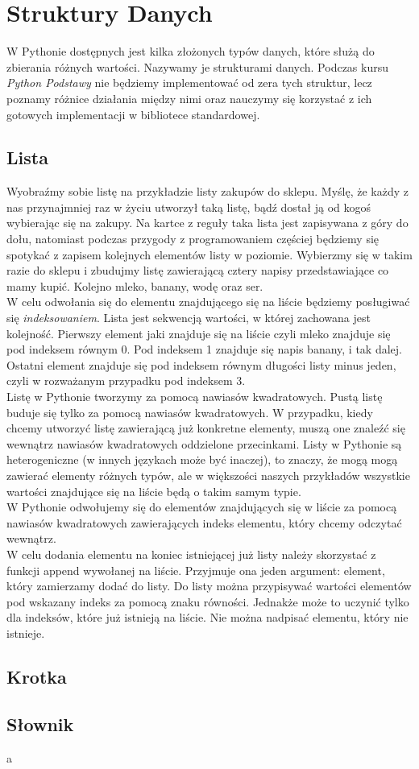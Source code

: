 \documentclass[knowledge.tex]{subfiles}
\begin{document}
    \chapter{Struktury Danych}
    W Pythonie dostępnych jest kilka złożonych typów danych, które służą do zbierania różnych wartości. Nazywamy je strukturami danych. Podczas kursu \textit{Python Podstawy} nie będziemy implementować od zera tych struktur, lecz poznamy różnice działania między nimi oraz nauczymy się korzystać z ich gotowych implementacji w bibliotece standardowej. 
    \section{Lista}
    Wyobraźmy sobie listę na przykładzie listy zakupów do sklepu. Myślę, że każdy z nas przynajmniej raz w życiu utworzył taką listę, bądź dostał ją od kogoś wybierając się na zakupy. Na kartce z reguły taka lista jest zapisywana z góry do dołu, natomiast podczas przygody z programowaniem częściej będziemy się spotykać z zapisem kolejnych elementów listy w poziomie. Wybierzmy się w takim razie do sklepu i zbudujmy listę zawierającą cztery napisy przedstawiające co mamy kupić. Kolejno mleko, banany, wodę oraz ser.\\[0.3cm]
    W celu odwołania się do elementu znajdującego się na liście będziemy posługiwać się \textit{indeksowaniem}. Lista jest sekwencją wartości, w której zachowana jest kolejność. Pierwszy element jaki znajduje się na liście czyli mleko znajduje się pod indeksem równym 0. Pod indeksem 1 znajduje się napis banany, i tak dalej. Ostatni element znajduje się pod indeksem równym długości listy minus jeden, czyli w rozważanym przypadku pod indeksem 3.\\[0.3cm]
    Listę w Pythonie tworzymy za pomocą nawiasów kwadratowych. Pustą listę buduje się tylko za pomocą nawiasów kwadratowych. W przypadku, kiedy chcemy utworzyć listę zawierającą już konkretne elementy, muszą one znaleźć się wewnątrz nawiasów kwadratowych oddzielone przecinkami. Listy w Pythonie są heterogeniczne (w innych językach może być inaczej), to znaczy, że mogą mogą zawierać elementy różnych typów, ale w większości naszych przykładów wszystkie wartości znajdujące się na liście będą o takim samym typie.\\[0.3cm]
    W Pythonie odwołujemy się do elementów znajdujących się w liście za pomocą nawiasów kwadratowych zawierających indeks elementu, który chcemy odczytać wewnątrz.\\[0.3cm]
    W celu dodania elementu na koniec istniejącej już listy należy skorzystać z funkcji append wywołanej na liście. Przyjmuje ona jeden argument: element, który zamierzamy dodać do listy. Do listy można przypisywać wartości elementów pod wskazany indeks za pomocą znaku równości. Jednakże może to uczynić tylko dla indeksów, które już istnieją na liście. Nie można nadpisać elementu, który nie istnieje.
    
    
    \section{Krotka}
    \section{Słownik}
    a
\end{document}
